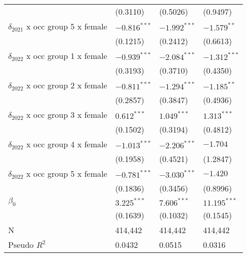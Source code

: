 \begin{tabular}{llll}
                                         &           (0.3110) &           (0.5026) &           (0.9497) \\
$\delta_{2021}$ x occ group 5 x female   &     $-0.816^{***}$ &     $-1.992^{***}$ &      $-1.579^{**}$ \\
                                         &           (0.1215) &           (0.2412) &           (0.6613) \\
$\delta_{2022}$ x occ group 1 x female   &     $-0.939^{***}$ &     $-2.084^{***}$ &     $-1.312^{***}$ \\
                                         &           (0.3193) &           (0.3710) &           (0.4350) \\
$\delta_{2022}$ x occ group 2 x female   &     $-0.811^{***}$ &     $-1.294^{***}$ &      $-1.185^{**}$ \\
                                         &           (0.2857) &           (0.3847) &           (0.4936) \\
$\delta_{2022}$ x occ group 3 x female   &      $0.612^{***}$ &      $1.049^{***}$ &      $1.313^{***}$ \\
                                         &           (0.1502) &           (0.3194) &           (0.4812) \\
$\delta_{2022}$ x occ group 4 x female   &     $-1.013^{***}$ &     $-2.206^{***}$ &           $-1.704$ \\
                                         &           (0.1958) &           (0.4521) &           (1.2847) \\
$\delta_{2022}$ x occ group 5 x female   &     $-0.781^{***}$ &     $-3.030^{***}$ &           $-1.420$ \\
                                         &           (0.1836) &           (0.3456) &           (0.8996) \\
$\beta_0$                                &      $3.225^{***}$ &      $7.606^{***}$ &     $11.195^{***}$ \\
                                         &           (0.1639) &           (0.1032) &           (0.1545) \\
N                                        &            414,442 &            414,442 &            414,442 \\
Pseudo $R^2$                             &             0.0432 &             0.0515 &             0.0316 \\
\bottomrule
\end{tabular}
